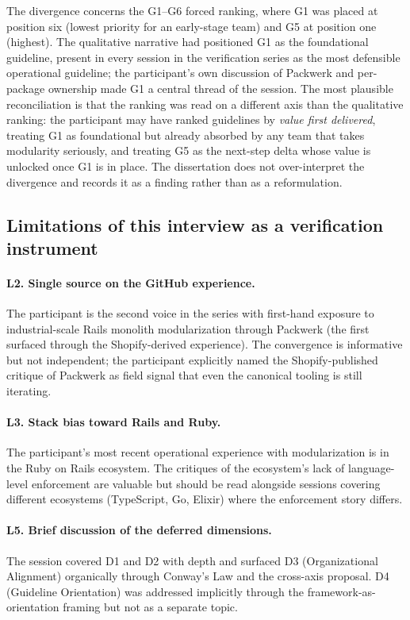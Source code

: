 The divergence concerns the G1--G6 forced ranking, where G1 was placed at position six (lowest priority for an early-stage team) and G5 at position one (highest). The qualitative narrative had positioned G1 as the foundational guideline, present in every session in the verification series as the most defensible operational guideline; the participant's own discussion of Packwerk and per-package ownership made G1 a central thread of the session. The most plausible reconciliation is that the ranking was read on a different axis than the qualitative ranking: the participant may have ranked guidelines by \emph{value first delivered}, treating G1 as foundational but already absorbed by any team that takes modularity seriously, and treating G5 as the next-step delta whose value is unlocked once G1 is in place. The dissertation does not over-interpret the divergence and records it as a finding rather than as a reformulation.

\subsection*{Limitations of this interview as a verification instrument}

\paragraph*{L2. Single source on the GitHub experience.} The participant is the second voice in the series with first-hand exposure to industrial-scale Rails monolith modularization through Packwerk (the first surfaced through the Shopify-derived experience). The convergence is informative but not independent; the participant explicitly named the Shopify-published critique of Packwerk as field signal that even the canonical tooling is still iterating.

\paragraph*{L3. Stack bias toward Rails and Ruby.} The participant's most recent operational experience with modularization is in the Ruby on Rails ecosystem. The critiques of the ecosystem's lack of language-level enforcement are valuable but should be read alongside sessions covering different ecosystems (TypeScript, Go, Elixir) where the enforcement story differs.

\paragraph*{L5. Brief discussion of the deferred dimensions.} The session covered D1 and D2 with depth and surfaced D3 (Organizational Alignment) organically through Conway's Law and the cross-axis proposal. D4 (Guideline Orientation) was addressed implicitly through the framework-as-orientation framing but not as a separate topic.

